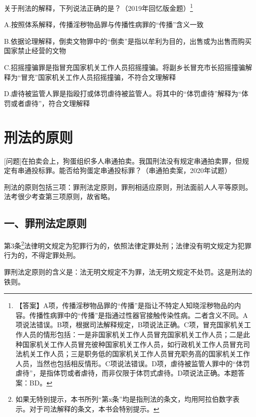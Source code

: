 
关于刑法的解释，下列说法正确的是？（2019年回忆版金题）\footnote{【答案】A项，传播淫秽物品罪的“传播”是指让不特定人知晓淫秽物品的内容。传播性病罪中的“传播”是指通过性器官接触传染性病。二者含义不同。A项说法错误。B项，根据司法解释规定，B项说法正确。C项，冒充国家机关工作人员的情形包括：一是非国家机关工作人员冒充国家机关工作人员；二是此种国家机关工作人员冒充彼种国家机关工作人员，如行政机关工作人员冒充司法机关工作人员；三是职务低的国家机关工作人员冒充职务高的国家机关工作人员，当然也包括相反情形。C项说法错误。D项，虐待被监管人罪中的“体罚虐待”，是指体罚或者虐待，而非仅限于体罚式虐待。D项说法正确。本题答案：BD。}

A.按照体系解释，传播淫秽物品罪与传播性病罪的“传播”含义一致

B.依据论理解释，倒卖文物罪中的“倒卖”是指以牟利为目的，出售或为出售而购买国家禁止经营的文物

C.招摇撞骗罪是指冒充国家机关工作人员招摇撞骗。将副乡长冒充市长招摇撞骗解释为“冒充”国家机关工作人员招摇撞骗，不符合文理解释

D.虐待被监管人罪是指殴打或体罚虐待被监管人。将其中的“体罚虐待”解释为“体罚或者虐待”，符合文理解释

\section{刑法的原则}

[问题]在拍卖会上，狗蛋组织多人串通拍卖。我国刑法没有规定串通拍卖罪，但规定有串通投标罪。能否给狗蛋定串通投标罪？（串通拍卖案，2020年试题）

刑法的原则包括三项：罪刑法定原则，罪刑相适应原则，刑法面前人人平等原则。法考很少考查第三项原则，故省略。

\subsection*{一、罪刑法定原则}

第3条\footnote{如果无特别提示，本书所列“第x条”均是指刑法的条文，均用阿拉伯数字表示。对于司法解释的条文，本书会特别提示。}法律明文规定为犯罪行为的，依照法律定罪处刑；法律没有明文规定为犯罪行为的，不得定罪处刑。

罪刑法定原则的含义是：法无明文规定不为罪，法无明文规定不处罚。这是刑法的铁则。

